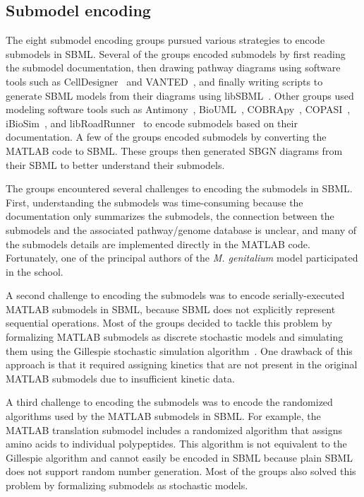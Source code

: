 \documentclass[journal,transmag]{IEEEtran}
\begin{document}
\subsection{Submodel encoding}
The eight submodel encoding groups pursued various strategies to encode submodels in SBML. Several of the groups encoded submodels by first reading the submodel documentation, then drawing pathway diagrams using software tools such as CellDesigner~\cite{funahashi2008celldesigner} and VANTED~\cite{Rohn2012}, and finally writing scripts to generate SBML models from their diagrams using libSBML~\cite{bornstein_2008}. Other groups used modeling software tools such as Antimony~\cite{Smith2009}, BioUML~\cite{Kolpakov2006}, COBRApy~\cite{ebrahim2013cobrapy}, COPASI~\cite{Mendes2009}, iBioSim~\cite{Madsen2012}, and libRoadRunner~\cite{Somogyi17062015} to encode submodels based on their documentation. A few of the groups encoded submodels by converting the MATLAB code to SBML. These groups then generated SBGN diagrams from their SBML to better understand their submodels.

The groups encountered several challenges to encoding the submodels in SBML. First, understanding the submodels was time-consuming because the documentation only summarizes the submodels, the connection between the submodels and the associated pathway/genome database is unclear, and many of the submodels details are implemented directly in the MATLAB code. Fortunately, one of the principal authors of the \textit{M. genitalium} model participated in the school.

A second challenge to encoding the submodels was to encode serially-executed MATLAB submodels in SBML, because SBML does not explicitly represent sequential operations. Most of the groups decided to tackle this problem by formalizing MATLAB submodels as discrete stochastic models and simulating them using the Gillespie stochastic simulation algorithm~\cite{gillespie1977}. One drawback of this approach is that it required assigning kinetics that are not present in the original MATLAB submodels due to insufficient kinetic data.

A third challenge to encoding the submodels was to encode the randomized algorithms used by the MATLAB submodels in SBML. For example, the MATLAB translation submodel includes a randomized algorithm that assigns amino acids to individual polypeptides. This algorithm is not equivalent to the Gillespie algorithm and cannot easily be encoded in SBML because plain SBML does not support random number generation. Most of the groups also solved this problem by formalizing submodels as stochastic models.
\end{document}
